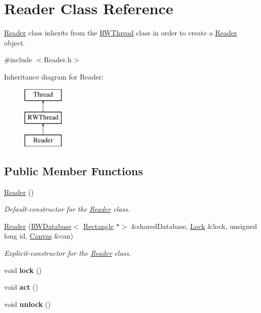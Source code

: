\hypertarget{class_reader}{}\section{Reader Class Reference}
\label{class_reader}


\hyperlink{class_reader}{Reader} class inherits from the \hyperlink{class_r_w_thread}{R\+W\+Thread} class in order to create a \hyperlink{class_reader}{Reader} object.  




{\ttfamily \#include $<$Reader.\+h$>$}

Inheritance diagram for Reader\+:\begin{figure}[H]
\begin{center}
\leavevmode
\includegraphics[height=3.000000cm]{class_reader}
\end{center}
\end{figure}
\subsection*{Public Member Functions}
\begin{DoxyCompactItemize}
\item 
\hyperlink{class_reader_adcda31b507720ab44044d7a21686fba2}{Reader} ()
\begin{DoxyCompactList}\small\item\em Default-\/constructor for the \hyperlink{class_reader}{Reader} class. \end{DoxyCompactList}\item 
\hyperlink{class_reader_a5c2576afadd1be193f99fb6d54787b56}{Reader} (\hyperlink{class_r_w_database}{R\+W\+Database}$<$ \hyperlink{classtsgl_1_1_rectangle}{Rectangle} $\ast$$>$ \&shared\+Database, \hyperlink{class_lock}{Lock} \&lock, unsigned long id, \hyperlink{classtsgl_1_1_canvas}{Canvas} \&can)
\begin{DoxyCompactList}\small\item\em Explicit-\/constructor for the \hyperlink{class_reader}{Reader} class. \end{DoxyCompactList}\item 
\mbox{\label{class_reader_a83d805383b755b46f43491f8a0c8f3f8}} 
void {\bfseries lock} ()
\item 
\mbox{\label{class_reader_a89f5f3c7107185ac9a8d54c6464b7ee3}} 
void {\bfseries act} ()
\item 
\mbox{\label{class_reader_ae6fdb55ccd1f482824e64f72c65b83e0}} 
void {\bfseries unlock} ()
\end{DoxyCompactItemize}
